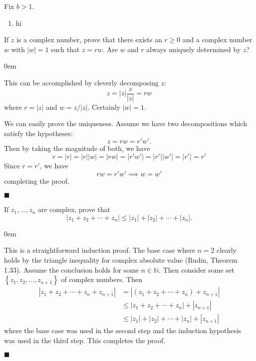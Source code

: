 \documentclass[12pt]{article}
\renewcommand{\qed}{\hfill$\blacksquare$}
\renewenvironment{proof}{\begin{addmargin}[1em]{0em}\begin{newproof}}{\end{newproof}\end{addmargin}\qed}
\newenvironment{problem}[2][Exercise]{\begin{trivlist}
\item[\hskip \labelsep {\bfseries #1}\hskip \labelsep {\bfseries #2.}]}{\end{trivlist}}
\begin{document}
\begin{problem}{1.6} 
Fix $b>1$.
\begin{enumerate}[label=(\alph*)]
	\item hi
\end{enumerate}
\end{problem}




\begin{problem}{1.11}
If $z$ is a complex number, prove that there exists an $r\geq 0$ and a complex number $w$ with $\left|w\right|=1$ such that $z=rw$. Are $w$ and $r$ always uniquely determined by $z$?
\end{problem} 
\begin{proof}
This can be accomplished by cleverly decomposing $z$: $$ z= \left|z\right| \frac{z}{\left|z\right|} = rw $$ where $r=\left|z\right|$ and $w = z / \left|z\right|$. Certainly $\left|w\right|=1$.

We can easily prove the uniqueness. Assume we have two decompositions which satisfy the hypotheses: $$ z= rw = r'w'. $$ Then by taking the magnitude of both, we have $$  r = \left|r\right| = \left|r\right|\left|w\right| = \left|rw\right| = \left|r'w'\right| = \left|r'\right| \left| w'\right| = \left|r'\right| = r' $$ Since $r= r'$, we have $$ rw = r'w' \implies w=w' $$ completing the proof.
\end{proof}


\begin{problem}{1.12}
If $z_1,\ldots,z_n$ are complex, prove that $$ \left|z_1 + z_2 + \cdots + z_n \right| \leq \left|z_1\right| + \left|z_2\right| + \cdots + \left|z_n\right|. $$
\end{problem}
\begin{proof}
This is a straightforward induction proof. The base case where $n=2$ clearly holds by the triangle inequality for complex absolute value (Rudin, Theorem 1.33). Assume the conclusion holds for some $n\in \mathbb{N}$. Then consider some set $\left\{z_1,z_2,\ldots,z_{n+1}\right\}$ of complex numbers. Then \begin{align*}
\left|z_1 + z_2 + \cdots + z_n + z_{n+1}\right| & = \left|\left(z_1 + z_2 + \cdots + z_n\right) + z_{n+1}\right| \\ & \leq \left| z_1 + z_2 + \cdots + z_n\right| + \left| z_{n+1}\right| \\
& \leq \left|z_1\right| + \left|z_2\right| + \cdots + \left|z_n\right| + \left|z_{n+1}\right| 
\end{align*} where the base case was used in the second step and the induction hypothesis was used in the third step. This completes the proof.
\end{proof}
\end{document}
